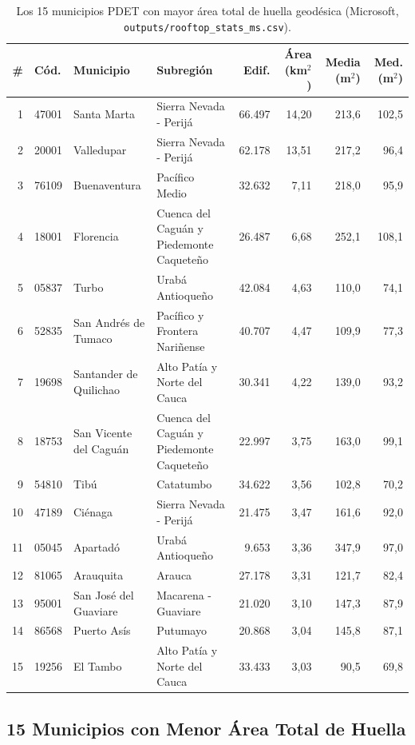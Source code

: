 \documentclass[11pt, a4paper]{article}
\begin{document}
\begin{table}[H]
\footnotesize
\setlength{\tabcolsep}{3.5pt}
\centering
\begin{tabular}{rlp{3.0cm}p{3.5cm}rrrr}
\toprule
\textbf{\#} & \textbf{Cód.} & \textbf{Municipio} & \textbf{Subregión} & \textbf{Edif.} & \textbf{Área (km$^2$)} & \textbf{Media (m$^2$)} & \textbf{Med. (m$^2$)} \\
\midrule
1 & 47001 & Santa Marta & Sierra Nevada - Perijá & 66.497 & 14,20 & 213,6 & 102,5 \\
2 & 20001 & Valledupar & Sierra Nevada - Perijá & 62.178 & 13,51 & 217,2 & 96,4 \\
3 & 76109 & Buenaventura & Pacífico Medio & 32.632 & 7,11 & 218,0 & 95,9 \\
4 & 18001 & Florencia & Cuenca del Caguán y Piedemonte Caqueteño & 26.487 & 6,68 & 252,1 & 108,1 \\
5 & 05837 & Turbo & Urabá Antioqueño & 42.084 & 4,63 & 110,0 & 74,1 \\
6 & 52835 & San Andrés de Tumaco & Pacífico y Frontera Nariñense & 40.707 & 4,47 & 109,9 & 77,3 \\
7 & 19698 & Santander de Quilichao & Alto Patía y Norte del Cauca & 30.341 & 4,22 & 139,0 & 93,2 \\
8 & 18753 & San Vicente del Caguán & Cuenca del Caguán y Piedemonte Caqueteño & 22.997 & 3,75 & 163,0 & 99,1 \\
9 & 54810 & Tibú & Catatumbo & 34.622 & 3,56 & 102,8 & 70,2 \\
10 & 47189 & Ciénaga & Sierra Nevada - Perijá & 21.475 & 3,47 & 161,6 & 92,0 \\
11 & 05045 & Apartadó & Urabá Antioqueño & 9.653 & 3,36 & 347,9 & 97,0 \\
12 & 81065 & Arauquita & Arauca & 27.178 & 3,31 & 121,7 & 82,4 \\
13 & 95001 & San José del Guaviare & Macarena - Guaviare & 21.020 & 3,10 & 147,3 & 87,9 \\
14 & 86568 & Puerto Asís & Putumayo & 20.868 & 3,04 & 145,8 & 87,1 \\
15 & 19256 & El Tambo & Alto Patía y Norte del Cauca & 33.433 & 3,03 & 90,5 & 69,8 \\
\bottomrule
\end{tabular}
\caption{Los 15 municipios PDET con mayor área total de huella geodésica (Microsoft, \texttt{outputs/rooftop\_stats\_ms.csv}).}
\label{tab:top15}
\end{table}

\subsection{15 Municipios con Menor Área Total de Huella}
\end{document}
